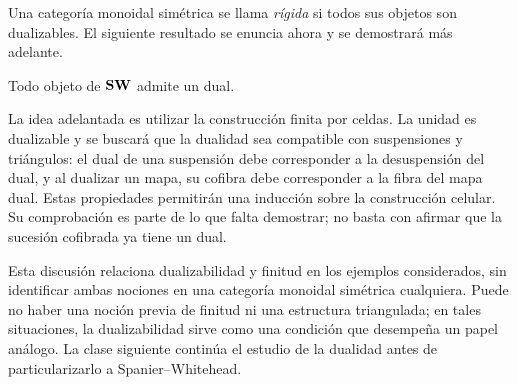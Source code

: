 Una categoría monoidal simétrica se llama \emph{rígida} si todos sus objetos son dualizables. El siguiente resultado se enuncia ahora y se demostrará más adelante.

\begin{prop}\label{prop:dualizable-sw}
Todo objeto de $\mathbf{SW}$ admite un dual.
\end{prop}

La idea adelantada es utilizar la construcción finita por celdas. La unidad es dualizable y se buscará que la dualidad sea compatible con suspensiones y triángulos: el dual de una suspensión debe corresponder a la desuspensión del dual, y al dualizar un mapa, su cofibra debe corresponder a la fibra del mapa dual. Estas propiedades permitirán una inducción sobre la construcción celular. Su comprobación es parte de lo que falta demostrar; no basta con afirmar que la sucesión cofibrada ya tiene un dual.

Esta discusión relaciona dualizabilidad y finitud en los ejemplos considerados, sin identificar ambas nociones en una categoría monoidal simétrica cualquiera. Puede no haber una noción previa de finitud ni una estructura triangulada; en tales situaciones, la dualizabilidad sirve como una condición que desempeña un papel análogo. La clase siguiente continúa el estudio de la dualidad antes de particularizarlo a Spanier--Whitehead.
